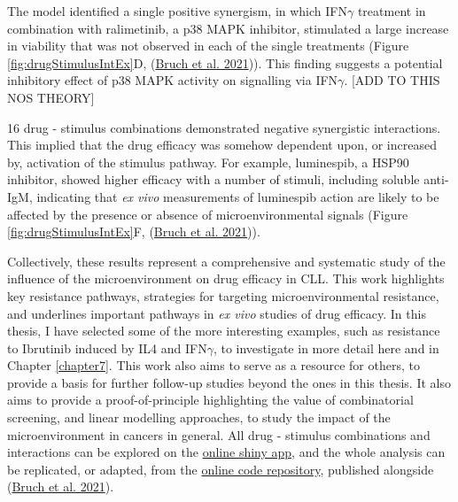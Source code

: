 \documentclass[11pt, a4paper, twosided]{book}
\begin{document}
The model identified a single positive synergism, in which IFN\(\gamma\) treatment in combination with ralimetinib, a p38 MAPK inhibitor, stimulated a large increase in viability that was not observed in each of the single treatments (Figure \ref{fig:drugStimulusIntEx}D, (\protect\hyperlink{ref-Giles2021}{Bruch et al. 2021})). This finding suggests a potential inhibitory effect of p38 MAPK activity on signalling via IFN\(\gamma\). {[}ADD TO THIS NOS THEORY{]}

16 drug - stimulus combinations demonstrated negative synergistic interactions. This implied that the drug efficacy was somehow dependent upon, or increased by, activation of the stimulus pathway. For example, luminespib, a HSP90 inhibitor, showed higher efficacy with a number of stimuli, including soluble anti-IgM, indicating that \emph{ex vivo} measurements of luminespib action are likely to be affected by the presence or absence of microenvironmental signals (Figure \ref{fig:drugStimulusIntEx}F, (\protect\hyperlink{ref-Giles2021}{Bruch et al. 2021})).

Collectively, these results represent a comprehensive and systematic study of the influence of the microenvironment on drug efficacy in CLL. This work highlights key resistance pathways, strategies for targeting microenvironmental resistance, and underlines important pathways in \emph{ex vivo} studies of drug efficacy. In this thesis, I have selected some of the more interesting examples, such as resistance to Ibrutinib induced by IL4 and IFN\(\gamma\), to investigate in more detail here and in Chapter \ref{chapter7}. This work also aims to serve as a resource for others, to provide a basis for further follow-up studies beyond the ones in this thesis. It also aims to provide a proof-of-principle highlighting the value of combinatorial screening, and linear modelling approaches, to study the impact of the microenvironment in cancers in general. All drug - stimulus combinations and interactions can be explored on the \href{https://www.imbi.uni-heidelberg.de/dietrichlab/CLL_Microenvironment/}{online shiny app}, and the whole analysis can be replicated, or adapted, from the \href{https://github.com/Huber-group-EMBL/CLLCytokineScreen2021}{online code repository}, published alongside (\protect\hyperlink{ref-Giles2021}{Bruch et al. 2021}).
\end{document}
